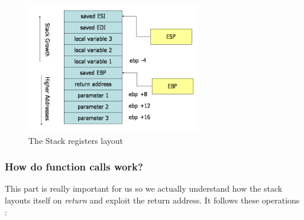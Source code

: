 \documentclass[11pt]{article}
\begin{document}
{\begin{figure}[htbp]
\centering
\includegraphics[width=3in]{res/stack-convention.png}
\caption{\label{StackReg}
The Stack registers layout}
\end{figure}

\subsubsection{How do function calls work?}
\label{sec:orgd18e68f}
This part is really important for us so we actually understand how the stack layouts itself on \emph{return} and exploit the return address. It follows these operations \cite{hu_understanding_nodate}:

}
\end{document}
